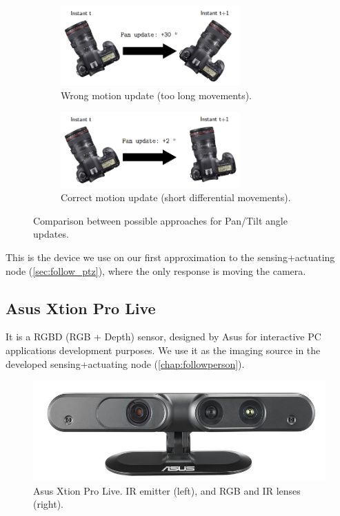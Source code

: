 		\begin{figure}[h]
			\centering
			\begin{subfigure}[h]{0.4\linewidth}
				\centering
				\includegraphics[width=2.7in]{images/ptz_wrong_movement}
				\caption{Wrong motion update (too long movements).}
				\label{fig:3_ptz_wrong}
			\end{subfigure}
			\qquad
			\begin{subfigure}[h]{0.4\linewidth}
				\centering
				\includegraphics[width=2.7in]{images/ptz_correct_movement}
				\caption{Correct motion update (short differential movements).}
				\label{fig:3_ptz_right}
			\end{subfigure}
			\caption{Comparison between possible approaches for Pan/Tilt angle updates.}
			\label{fig:3_ptz_movements}
		\end{figure}
		

		This is the device we use on our first approximation to the sensing+actuating node (\autoref{sec:follow_ptz}), where the only response is moving the camera.\\

	\subsection{Asus Xtion Pro Live}
		\label{sec:3_xtion}
		It is a RGBD (RGB + Depth) sensor, designed by Asus for interactive PC applications development purposes. We use it as the imaging source in the developed sensing+actuating node (\autoref{chap:followperson}).\\

		\begin{figure}[h]
			\centering
			\includegraphics[width=0.4\linewidth]{images/xtion}
			\caption{Asus Xtion Pro Live. IR emitter (left), and RGB and IR lenses (right).}
			\label{fig:3_xtion}
		\end{figure}

